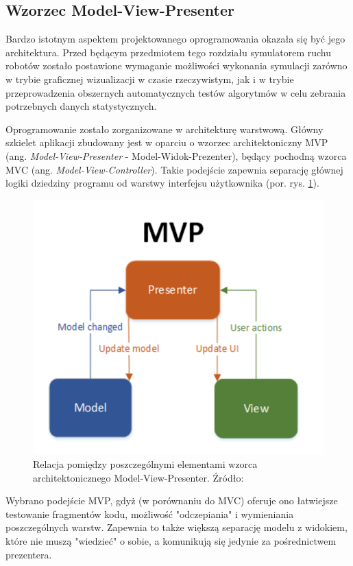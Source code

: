 \subsection{Wzorzec Model-View-Presenter}
\label{ch:app-mvp}
Bardzo istotnym aspektem projektowanego oprogramowania okazała się być jego architektura. Przed będącym przedmiotem tego rozdziału symulatorem ruchu robotów zostało postawione wymaganie możliwości wykonania symulacji zarówno w trybie graficznej wizualizacji w czasie rzeczywistym, jak i w trybie przeprowadzenia obszernych automatycznych testów algorytmów w celu zebrania potrzebnych danych statystycznych.

Oprogramowanie zostało zorganizowane w architekturę warstwową.
Główny szkielet aplikacji zbudowany jest w oparciu o wzorzec architektoniczny MVP (ang. {\it Model-View-Presenter} - Model-Widok-Prezenter), będący pochodną wzorca MVC (ang. {\it Model-View-Controller}).
Takie podejście zapewnia separację głównej logiki dziedziny programu od warstwy interfejsu użytkownika \cite{mvp} (por. rys. \ref{fig:app-mvp}).

\begin{figure}
	\centering
	\includegraphics[width=0.6\columnwidth]{img/app/mvp}
	\caption{Relacja pomiędzy poszczególnymi elementami wzorca architektonicznego Model-View-Presenter. Źródło: \cite{mvp}}
	\label{fig:app-mvp}
\end{figure}

Wybrano podejście MVP, gdyż (w porównaniu do MVC) oferuje ono łatwiejsze testowanie fragmentów kodu, możliwość "odczepiania" i wymieniania poszczególnych warstw.
Zapewnia to także większą separację modelu z widokiem, które nie muszą "wiedzieć" o sobie, a komunikują się jedynie za pośrednictwem prezentera.

